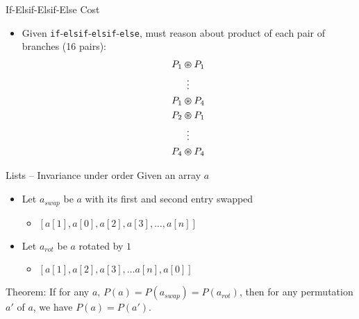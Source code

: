 \documentclass[usenames,dvipsnames]{beamer}
\begin{document}
\begin{frame}[fragile]{If-Elsif-Elsif-Else Cost}
    \begin{itemize}
        \item<1-> Given \verb!if!-\verb!elsif!-\verb!elsif!-\verb!else!, must reason about product of each pair of branches (16 pairs):
        \begin{gather*}
        P_{1} \varoast P_{1}\\
        \vdots\\
        P_{1} \varoast P_{4}\\
        P_{2} \varoast P_{1}\\
        \vdots\\
        P_{4} \varoast P_{4}
        \end{gather*}
    \end{itemize}
\end{frame}

\begin{frame}[fragile]{Lists -- Invariance under order}
  Given an array $a$
  \begin{itemize}
    \item Let $a_{swap}$ be $a$ with its first and second entry swapped
    \begin{itemize}
      \item $[ a[1], a[0], a[2], a[3], \ldots, a[n] ]$
    \end{itemize}
    \item Let $a_{rot}$ be $a$ rotated by $1$
    \begin{itemize}
      \item $[ a[1], a[2], a[3], \ldots  a[n], a[0] ]$
    \end{itemize}
  \end{itemize}
  \vfill
  Theorem: If for any $a$, $P(a) = P(a_{swap}) = P(a_{rot})$,
  then for any permutation $a'$ of $a$,
  we have $P(a) = P(a')$.
\end{frame}
\end{document}
